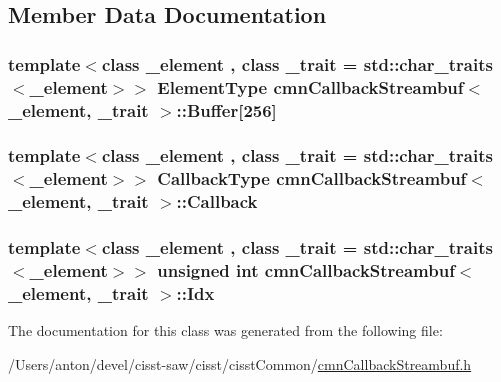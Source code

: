 \subsection{Member Data Documentation}
\hypertarget{classcmn_callback_streambuf_ace8ce96c1695f3122b14be13b2129383}{}
\subsubsection[{Buffer}]{\setlength{\rightskip}{0pt plus 5cm}template$<$class \+\_\+element , class \+\_\+trait  = std\+::char\+\_\+traits$<$\+\_\+element$>$$>$ {\bf Element\+Type} {\bf cmn\+Callback\+Streambuf}$<$ \+\_\+element, \+\_\+trait $>$\+::Buffer\mbox{[}256\mbox{]}\hspace{0.3cm}{\ttfamily [protected]}}\label{classcmn_callback_streambuf_ace8ce96c1695f3122b14be13b2129383}
\hypertarget{classcmn_callback_streambuf_a8d35b607ee946b5574313a3f3f19be27}{}
\subsubsection[{Callback}]{\setlength{\rightskip}{0pt plus 5cm}template$<$class \+\_\+element , class \+\_\+trait  = std\+::char\+\_\+traits$<$\+\_\+element$>$$>$ {\bf Callback\+Type} {\bf cmn\+Callback\+Streambuf}$<$ \+\_\+element, \+\_\+trait $>$\+::Callback\hspace{0.3cm}{\ttfamily [protected]}}\label{classcmn_callback_streambuf_a8d35b607ee946b5574313a3f3f19be27}
\hypertarget{classcmn_callback_streambuf_a27d747a886699be88098955251af1159}{}
\subsubsection[{Idx}]{\setlength{\rightskip}{0pt plus 5cm}template$<$class \+\_\+element , class \+\_\+trait  = std\+::char\+\_\+traits$<$\+\_\+element$>$$>$ unsigned int {\bf cmn\+Callback\+Streambuf}$<$ \+\_\+element, \+\_\+trait $>$\+::Idx\hspace{0.3cm}{\ttfamily [protected]}}\label{classcmn_callback_streambuf_a27d747a886699be88098955251af1159}


The documentation for this class was generated from the following file\+:\begin{DoxyCompactItemize}
\item 
/\+Users/anton/devel/cisst-\/saw/cisst/cisst\+Common/\hyperlink{cmn_callback_streambuf_8h}{cmn\+Callback\+Streambuf.\+h}\end{DoxyCompactItemize}
